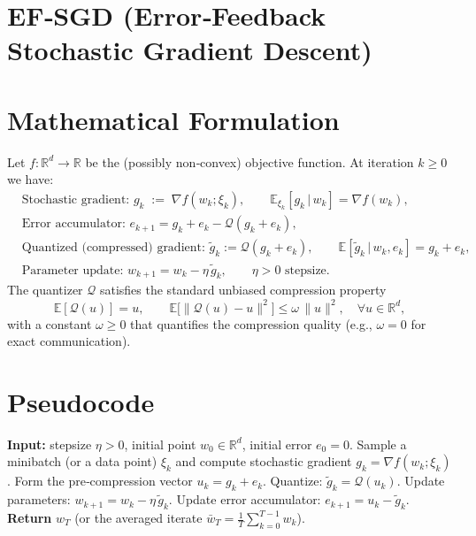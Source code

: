 \documentclass{article}
\newcommand{\E}{\mathbb{E}}
\newcommand{\R}{\mathbb{R}}
\newcommand{\Q}{\mathcal{Q}}
\begin{document}
\section*{EF‑SGD (Error‑Feedback Stochastic Gradient Descent)}

\section*{Mathematical Formulation}
Let $f:\R^{d}\to\R$ be the (possibly non‑convex) objective function.  
At iteration $k\ge 0$ we have:
\begin{align}
    &\text{Stochastic gradient: } g_k \;:=\; \nabla f(w_k; \xi_k),\qquad 
      \E_{\xi_k}[g_k\,|\,w_k]=\nabla f(w_k), \label{eq:sgd}\\[4pt]
    &\text{Error accumulator: } e_{k+1}= g_k+e_k-\Q(g_k+e_k), \label{eq:error}\\[4pt]
    &\text{Quantized (compressed) gradient: } \tilde g_k:=\Q(g_k+e_k),\qquad 
      \E[\tilde g_k\,|\,w_k,e_k]=g_k+e_k, \label{eq:quant}\\[4pt]
    &\text{Parameter update: } w_{k+1}= w_k-\eta\,\tilde g_k, \qquad \eta>0 \text{ stepsize}. \label{eq:update}
\end{align}
The quantizer $\Q$ satisfies the standard unbiased compression property  
\[
    \E[\Q(u)]=u,\qquad 
    \E\big[\|\Q(u)-u\|^{2}\big]\le \omega\,\|u\|^{2},\quad\forall u\in\R^{d},
\tag{C}
\]
with a constant $\omega\ge0$ that quantifies the compression quality (e.g., $\omega=0$ for exact communication).

\section*{Pseudocode}
\begin{algorithm}[H]
\caption{EF‑SGD}
\begin{algorithmic}[1]
\State \textbf{Input:} stepsize $\eta>0$, initial point $w_0\in\R^{d}$, initial error $e_0=0$.
    \State Sample a minibatch (or a data point) $\xi_k$ and compute stochastic gradient $g_k=\nabla f(w_k;\xi_k)$.
    \State Form the pre‑compression vector $u_k = g_k+e_k$.
    \State Quantize: $\tilde g_k = \Q(u_k)$.
    \State Update parameters: $w_{k+1}= w_k-\eta\,\tilde g_k$.
    \State Update error accumulator: $e_{k+1}= u_k-\tilde g_k$.
\EndFor
\State \textbf{Return} $w_T$ (or the averaged iterate $\bar w_T=\frac1T\sum_{k=0}^{T-1}w_k$).
\end{algorithmic}
\end{algorithm}
\end{document}
